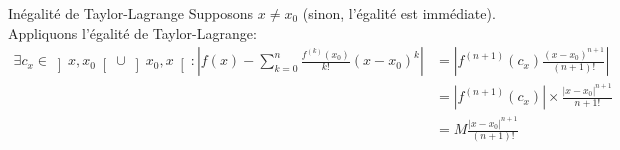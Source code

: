 \documentclass{article}
\renewenvironment{question_kholle}[2][ ]
{
	\subsection{\texorpdfstring{#2}{}}
	\notblank{#1}
	{
		\noindent #1
		\bigbreak
	}
	{}
	\begin{proof}
}
{
	\end{proof}
}
\begin{document}
\begin{question_kholle}{Inégalité de Taylor-Lagrange}
	Supposons $x\neq x_{0}$ (sinon, l’égalité est immédiate). Appliquons l’égalité de Taylor-Lagrange:
	\begin{align*}
		\exists c_{x}\in \left]x,x_{0}\right[\cup\left]x_{0}, x\right[: \left| f(x)-\sum_{k=0}^{n}\frac{f^{(k)}(x_{0})}{k!}(x-x_{0})^{k} \right| & = \left| f^{(n+1)}(c_{x})\frac{(x-x_{0})^{n+1}}{(n+1)!}\right|     \\
		                                                                                                                                         & =\left|f^{(n+1)}(c_{x})\right| \times \frac{|x-x_{0}|^{n+1}}{n+1!} \\
		                                                                                                                                         & =M \frac{|x-x_{0}|^{n+1}}{(n+1)!}
	\end{align*}
\end{question_kholle}
\end{document}

